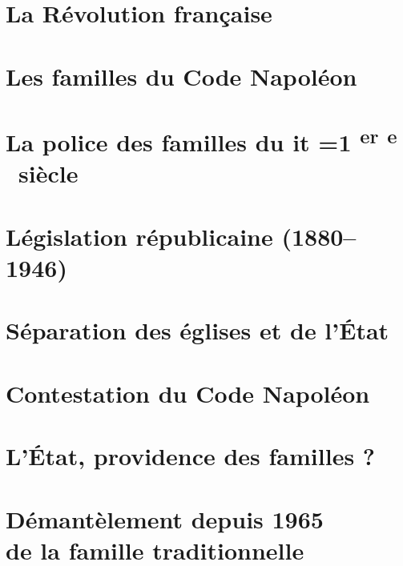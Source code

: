 \documentclass[12pt,french]{book}
\makeatletter
\newcommand*{\my@test@it}{it}
\newcommand*{\crm}[1]{%
\ifx\f@shape\my@test@it%
  \textsc{\textsl{\romannumeral #1}}\relax
\else%
  \textsc{\romannumeral #1}\relax
\fi}
\newcommand*{\crmieme}[1]{%
\crm{#1}%
\ifnum#1=1%
  \ifdefined\ier%
    \ier%
  \else%
    \textsuperscript{\lowercase{er}}%
  \fi%
\else%
  \ifdefined\ieme%
    \ieme%
  \else%
    \textsuperscript{\lowercase{e}}%
  \fi%
\fi%
}
\newcommand*{\siecle}[1]{%
\crmieme{#1}\ siècle%
}
\makeatother
\begin{document}
\chapter{La Révolution française}


\chapter{Les familles du Code Napoléon}


\chapter{La police des familles du \siecle{19}}


\chapter{Législation républicaine (1880--1946)}


\chapter{Séparation des églises et de l'État}


\chapter{Contestation du Code Napoléon}


\chapter{L'État, providence des familles ?}


\chapter[Démantèlement depuis 1965 de la famille traditionnelle]{Démantèlement depuis 1965\\de la famille traditionnelle}

\end{document}
